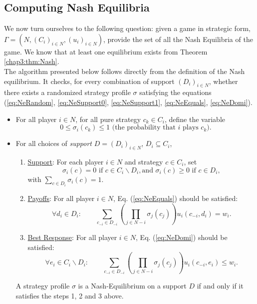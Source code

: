 \subsection{Computing Nash Equilibria}

We now turn ourselves to the following question: given a game in strategic form, 
$\Gamma = (N, (C_i)_{i \in N}, (u_i)_{i \in N})$, provide the set of all the Nash Equilibria of the game. 
We know that at least one equilibrium exists from Theorem \ref{chap3:thm:Nash}. \\
The algorithm presented below follows directly from the definition of the Nash equilibrium. It checks, for every combination of support $(D_i)_{i \in N}$, whether there exists a randomized strategy profile $\sigma$ satisfying the equations (\ref{eq:NeRandom}, \ref{eq:NeSupport0}, \ref{eq:NeSupport1}, \ref{eq:NeEquals},  \ref{eq:NeDomi}). 


\begin{procedure}
\begin{itemize}
\item For all player $i \in N$, for all pure strategy $c_k \in C_i$, define the variable 
$$ 0 \leq \sigma_i(c_k) \leq 1 \text{ (the probability that $i$ plays $c_k$)}.$$ 
\item For all choices of \emph{support} $D = (D_i)_{i \in N}$, $D_i \subseteq C_i$, 
\begin{enumerate}
\item \underline{Support}:
 For each player $i \in N$ and strategy $c \in C_i$, set
$$ \sigma_i(c) = 0 \text{ if $c \in C_i \backslash D_i$}, \text{and } \sigma_i(c) \geq 0 \text{ if $c \in D_i$},$$
with $ \sum_{c \in D_i} \sigma_i(c) = 1$. 
\label{chap3:prc2:support}
\item \underline{Payoffs}: For all player $i \in N$,  Eq. (\ref{eq:NeEquals}) should be satisfied:
$$ \forall d_i \in D_i:  \qquad  \sum_{c_{-i} \in D_{-i}} \left  ( \prod_{j \in N-i} \sigma_j(c_j) \right ) u_i(c_{-i}, d_i) = w_i.  $$
\label{chap3:prc2:equ}
\item \underline{Best Response}:  For all player $i \in N$, Eq. (\ref{eq:NeDomi}) should be satisfied:
$$ \forall e_i \in C_i \backslash D_i:  \qquad \sum_{c_{-i} \in D_{-i}} \left  ( \prod_{j \in N-i} \sigma_j(c_j) \right ) u_i(c_{-i}, e_i) \leq w_i. $$
 \label{chap3:prc2:domi}
\end{enumerate}
A strategy profile $\sigma$ is a Nash-Equilibrium on a support $D$ if and only if it satisfies the steps 1, 2 and 3 above.
\end{itemize}
\label{chap3:proc:computeNash}
\end{procedure}


